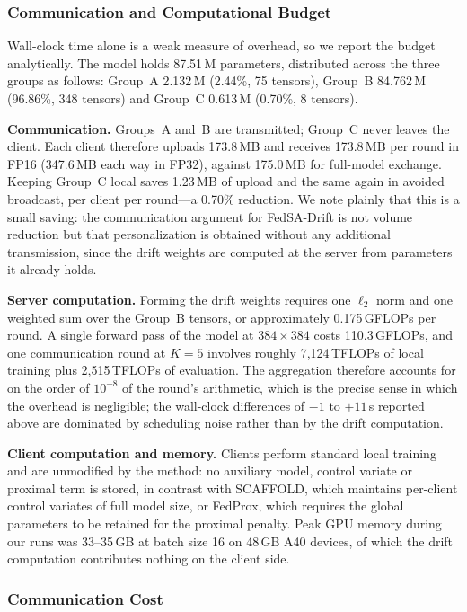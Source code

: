 \documentclass{ieeeaccess}
\newcommand{\sadrift}{FedSA-Drift}
\begin{document}
\subsubsection{Communication and Computational Budget}
\label{sec:budget}

Wall-clock time alone is a weak measure of overhead, so we report the budget analytically. The model holds 87.51\,M parameters, distributed across the three groups as follows: Group~A 2.132\,M (2.44\%, 75 tensors), Group~B 84.762\,M (96.86\%, 348 tensors) and Group~C 0.613\,M (0.70\%, 8 tensors).

\textbf{Communication.} Groups~A and~B are transmitted; Group~C never leaves the client. Each client therefore uploads 173.8\,MB and receives 173.8\,MB per round in FP16 (347.6\,MB each way in FP32), against 175.0\,MB for full-model exchange. Keeping Group~C local saves 1.23\,MB of upload and the same again in avoided broadcast, per client per round---a 0.70\% reduction. We note plainly that this is a small saving: the communication argument for \sadrift{} is not volume reduction but that personalization is obtained without any additional transmission, since the drift weights are computed at the server from parameters it already holds.

\textbf{Server computation.} Forming the drift weights requires one $\ell_2$ norm and one weighted sum over the Group~B tensors, or approximately 0.175\,GFLOPs per round. A single forward pass of the model at $384{\times}384$ costs 110.3\,GFLOPs, and one communication round at $K{=}5$ involves roughly 7{,}124\,TFLOPs of local training plus 2{,}515\,TFLOPs of evaluation. The aggregation therefore accounts for on the order of $10^{-8}$ of the round's arithmetic, which is the precise sense in which the overhead is negligible; the wall-clock differences of $-1$ to $+11$\,s reported above are dominated by scheduling noise rather than by the drift computation.

\textbf{Client computation and memory.} Clients perform standard local training and are unmodified by the method: no auxiliary model, control variate or proximal term is stored, in contrast with SCAFFOLD, which maintains per-client control variates of full model size, or FedProx, which requires the global parameters to be retained for the proximal penalty. Peak GPU memory during our runs was 33--35\,GB at batch size 16 on 48\,GB A40 devices, of which the drift computation contributes nothing on the client side.

\subsubsection{Communication Cost}
\end{document}
